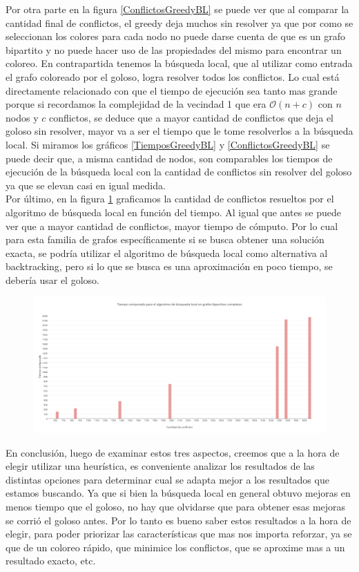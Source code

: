 Por otra parte en la figura \ref{ConflictosGreedyBL} se puede ver que al comparar la cantidad final de conflictos, el greedy deja muchos sin resolver ya que por como se seleccionan los colores para cada nodo no puede darse cuenta de que es un grafo bipartito y no puede hacer uso de las propiedades del mismo para encontrar un coloreo. En contrapartida tenemos la búsqueda local, que al utilizar como entrada el grafo coloreado por el goloso, logra resolver todos los conflictos. Lo cual está directamente relacionado con que el tiempo de ejecución sea tanto mas grande porque si recordamos la complejidad de la vecindad 1 que era $\mathcal{O}(n + c)$ con $n$ nodos y $c$ conflictos, se deduce que a mayor cantidad de conflictos que deja el goloso sin resolver, mayor va a ser el tiempo que le tome resolverlos a la búsqueda local. Si miramos los gráficos \ref{TiemposGreedyBL} y \ref{ConflictosGreedyBL} se puede decir que, a misma cantidad de nodos, son comparables los tiempos de ejecución de la búsqueda local con la cantidad de conflictos sin resolver del goloso ya que se elevan casi en igual medida.\\

Por último, en la figura \ref{ConfTiempoBL} graficamos la cantidad de conflictos resueltos por el algoritmo de búsqueda local en función del tiempo. Al igual que antes se puede ver que a mayor cantidad de conflictos, mayor tiempo de cómputo. Por lo cual para esta familia de grafos específicamente si se busca obtener una solución exacta, se podría utilizar el algoritmo de búsqueda local como alternativa al backtracking, pero si lo que se busca es una aproximación en poco tiempo, se debería usar el goloso.

\begin{figure}[H]
  \centering
  \includegraphics[width=18cm]{imagenes/Ej5/bipartitosCompletos/ConfTiempoBL.png}
  \caption{}
    \label{ConfTiempoBL}
\end{figure}

En conclusión, luego de examinar estos tres aspectos, creemos que a la hora de elegir utilizar una heurística, es conveniente analizar los resultados de las distintas opciones para determinar cual se adapta mejor a los resultados que estamos buscando. Ya que si bien la búsqueda local en general obtuvo mejoras en menos tiempo que el goloso, no hay que olvidarse que para obtener esas mejoras se corrió el goloso antes. Por lo tanto es bueno saber estos resultados a la hora de elegir, para poder priorizar las características que mas nos importa reforzar, ya se que de un coloreo rápido, que minimice los conflictos, que se aproxime mas a un resultado exacto, etc.
